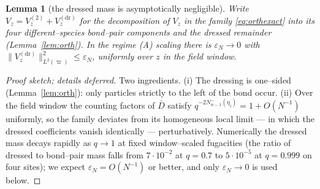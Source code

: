\documentclass[11pt]{article}
\theoremstyle{plain}
\newtheorem{lemma}[theorem]{Lemma}
\theoremstyle{definition}
\theoremstyle{remark}
\newcommand{\eps}{\varepsilon}\newcommand{\Exp}{\mathrm{Exp}}
\begin{document}
\begin{lemma}[the dressed mass is asymptotically negligible]\label{lem:eps}
Write $V_z=V_z^{(2)}+V_z^{(\mathrm{dr})}$ for the decomposition of $V_z$ in the
family \eqref{eq:orthexact} into its four different--species bond--pair components
and the dressed remainder (Lemma~\ref{lem:orth}). In the regime (A) scaling there is
$\eps_N\to0$ with $\|V^{(\mathrm{dr})}_z\|^2_{L^2(\varpi)}\le\eps_N$, uniformly over
$z$ in the field window.
\end{lemma}
\begin{proof}[Proof sketch; details deferred]
Two ingredients. (i) The dressing is one--sided (Lemma~\ref{lem:orth}): only
particles strictly to the left of the bond occur. (ii) Over the field window the
counting factors of $\bar D$ satisfy $q^{-2N^-_{w-1}(\eta_i)}=1+O(N^{-1})$
uniformly, so the family deviates from its homogeneous local limit --- in which the
dressed coefficients vanish identically --- perturbatively. Numerically the dressed
mass decays rapidly as $q\to1$ at fixed window--scaled fugacities (the ratio of
dressed to bond--pair mass falls from $7\cdot10^{-2}$ at $q=0.7$ to $5\cdot10^{-5}$
at $q=0.999$ on four sites); we expect $\eps_N=O(N^{-1})$ or better, and only
$\eps_N\to0$ is used below.
\end{proof}
\end{document}
